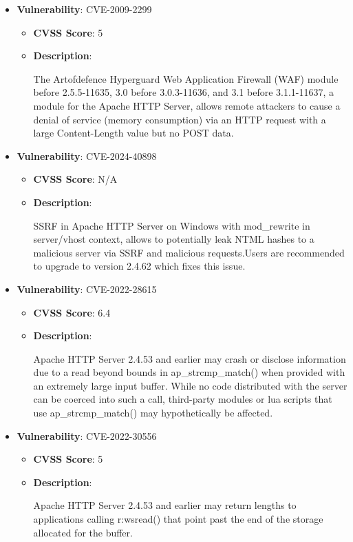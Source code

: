 \documentclass{article}
\begin{document}
\begin{itemize}
        \item \textbf{Vulnerability}: CVE-2009-2299
        \begin{itemize}
            \item \textbf{CVSS Score}:  5 
            \item \textbf{Description}:
            \parbox[t]{0.9\linewidth}{
                \ttfamily The Artofdefence Hyperguard Web Application Firewall (WAF) module before 2.5.5-11635, 3.0 before 3.0.3-11636, and 3.1 before 3.1.1-11637, a module for the Apache HTTP Server, allows remote attackers to cause a denial of service (memory consumption) via an HTTP request with a large Content-Length value but no POST data.
            }
        \end{itemize}
    
        \item \textbf{Vulnerability}: CVE-2024-40898
        \begin{itemize}
            \item \textbf{CVSS Score}:  N/A 
            \item \textbf{Description}:
            \parbox[t]{0.9\linewidth}{
                \ttfamily SSRF in Apache HTTP Server on Windows with mod\_rewrite in server/vhost context, allows to potentially leak NTML hashes to a malicious server via SSRF and malicious requests.Users are recommended to upgrade to version 2.4.62 which fixes this issue.
            }
        \end{itemize}
    
        \item \textbf{Vulnerability}: CVE-2022-28615
        \begin{itemize}
            \item \textbf{CVSS Score}:  6.4 
            \item \textbf{Description}:
            \parbox[t]{0.9\linewidth}{
                \ttfamily Apache HTTP Server 2.4.53 and earlier may crash or disclose information due to a read beyond bounds in ap\_strcmp\_match() when provided with an extremely large input buffer. While no code distributed with the server can be coerced into such a call, third-party modules or lua scripts that use ap\_strcmp\_match() may hypothetically be affected.
            }
        \end{itemize}
    
        \item \textbf{Vulnerability}: CVE-2022-30556
        \begin{itemize}
            \item \textbf{CVSS Score}:  5 
            \item \textbf{Description}:
            \parbox[t]{0.9\linewidth}{
                \ttfamily Apache HTTP Server 2.4.53 and earlier may return lengths to applications calling r:wsread() that point past the end of the storage allocated for the buffer.
            }
        \end{itemize}
    

\end{itemize}
\end{document}
